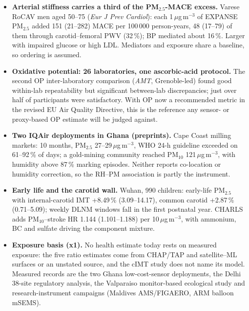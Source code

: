 \documentclass[10pt]{article}
\begin{document}
\footnotesize
\begin{itemize}

\item \textbf{Arterial stiffness carries a third of the PM$_{2.5}$-MACE excess.} Varese RoCAV men aged 50--75 (\textit{Eur J Prev Cardiol}): each 1\,$\mu$g\,m$^{-3}$ of EXPANSE PM$_{2.5}$ added 151 (21--282) MACE per 100\,000 person-years, 48 (17--79) of them through carotid--femoral PWV (32\,\%); BP mediated about 16\,\%. Larger with impaired glucose or high LDL. Mediators and exposure share a baseline, so ordering is assumed.

\item \textbf{Oxidative potential: 26 laboratories, one ascorbic-acid protocol.} The second OP inter-laboratory comparison (\textit{AMT}, Grenoble-led) found good within-lab repeatability but significant between-lab discrepancies; just over half of participants were satisfactory. With OP now a recommended metric in the revised EU Air Quality Directive, this is the reference any sensor- or proxy-based OP estimate will be judged against.

\item \textbf{Two IQAir deployments in Ghana (preprints).} Cape Coast milling markets: 10 months, PM$_{2.5}$ 27--29\,$\mu$g\,m$^{-3}$, WHO 24-h guideline exceeded on 61--92\,\% of days; a gold-mining community reached PM$_{10}$ 121\,$\mu$g\,m$^{-3}$, with humidity above 87\,\% marking episodes. Neither reports co-location or humidity correction, so the RH--PM association is partly the instrument.

\item \textbf{Early life and the carotid wall.} Wuhan, 990 children: early-life PM$_{2.5}$ with internal-carotid IMT +8.49\,\% (3.09--14.17), common carotid +2.87\,\% (0.71--5.09); weekly DLNM windows fall in the first postnatal year. CHARLS adds PM$_{10}$--stroke HR 1.144 (1.101--1.188) per 10\,$\mu$g\,m$^{-3}$, with ammonium, BC and sulfate driving the component mixture.

\item \textbf{Exposure basis (x1).} No health estimate today rests on measured exposure: the five ratio estimates come from CHAP/TAP and satellite--ML surfaces or an unstated source, and the cIMT study does not name its model. Measured records are the two Ghana low-cost-sensor deployments, the Delhi 38-site regulatory analysis, the Valparaiso monitor-based ecological study and research-instrument campaigns (Maldives AMS/FIGAERO, ARM balloon mSEMS).

\end{itemize}
\end{document}
